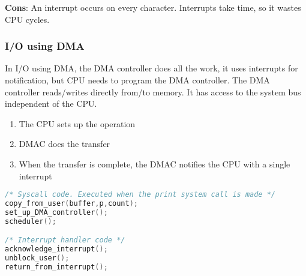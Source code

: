 \documentclass{article}
\newcommand{\bold}[1]{\textbf{#1}}
\begin{document}
\bold{Cons}: An interrupt occurs on every character. Interrupts take time, so it wastes CPU cycles. 

\subsubsection{I/O using DMA}

In I/O using DMA, the DMA controller does all the work, it uses interrupts for notification, but CPU needs to program the DMA controller. The DMA controller reads/writes directly from/to memory. It has access to the system bus independent of the CPU.

\begin{enumerate}
    \item The CPU sets up the operation
    \item DMAC does the transfer
    \item When the transfer is complete, the DMAC notifies the CPU with a single interrupt
\end{enumerate}

\begin{lstlisting}[language=C, caption=Printing a string using DMA]
/* Syscall code. Executed when the print system call is made */
copy_from_user(buffer,p,count);
set_up_DMA_controller();
scheduler();

/* Interrupt handler code */
acknowledge_interrupt();
unblock_user();
return_from_interrupt();
\end{lstlisting}
\end{document}
